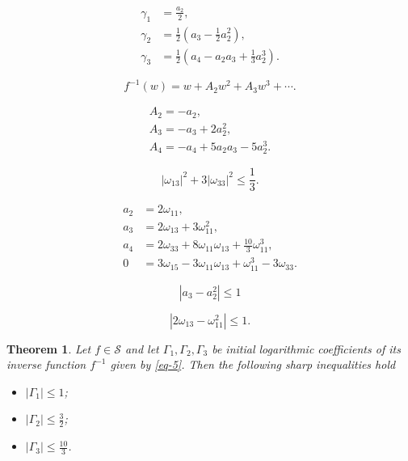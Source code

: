 \documentclass[10pt,a4paper]{amsart}
\newtheorem{thm}{Theorem}
\begin{document}
\begin{equation}\label{eq-3}
\begin{split}
 \gamma_{1}&=\frac{a_{2}}{2},\\
 \gamma_{2}&=\frac{1}{2}\left(a_3-\frac{1}{2}a_{2}^{2}\right), \\
 \gamma_{3}&=\frac{1}{2}\left(a_4-a_2a_3+\frac13a_2^3\right).
\end{split}
\end{equation}

\begin{equation}\label{eq-4}
f^{-1}(w) = w+A_2w^2+A_3w^3+\cdots.
\end{equation}

\begin{equation}\label{eq-5}
\begin{array}{l}
A_{2}=-a_{2}, \\
A _{3}=-a_{3}+2a_{2}^{2} , \\
A_{4}= -a_{4}+5a_{2}a_{3}-5a_{2}^{3}.
\end{array}
\end{equation}

\begin{equation}\label{eq-10a}
|\omega_{13}|^{2}+3|\omega_{33}|^{2}\leq\frac13.
\end{equation}

\begin{equation}\label{eq-11}
\begin{split}
a_{2}&=2\omega _{11},\\
a_{3}&=2\omega_{13}+3\omega_{11}^{2}, \\
a_{4}&=2\omega_{33}+8\omega_{11}\omega_{13}+\frac{10}{3}\omega_{11}^{3},\\
0&=3\omega_{15}-3\omega_{11}\omega_{13}+\omega_{11}^{3}-3\omega_{33}.
\end{split}
\end{equation}

\begin{equation}\label{eq-99}
|a_{3}-a_{2}^{2}|\leq1
\end{equation}

\begin{equation}\label{eq-100}
|2\omega_{13}-\omega_{11}^{2}|\leq1.
\end{equation}

\begin{thm}\label{th1}
Let $f\in\mathcal{S}$ and let $\Gamma_{1},\Gamma_{2},\Gamma_{3}$ be initial logarithmic coefficients of
its inverse function $f^{-1}$ given by \eqref{eq-5}. Then the following sharp inequalities hold
\begin{itemize}
  \item[($i$)] $|\Gamma_{1}|\leq 1$;
  \item[($ii$)] $|\Gamma_{2}| \leq\frac{3}{2}$;
  \item [($iii$)]$|\Gamma_{3}|\leq\frac{10}{3}$.
\end{itemize}
\end{thm}
\end{document}
